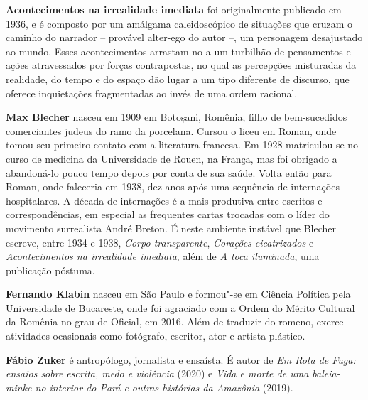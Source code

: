 \textbf{Acontecimentos na irrealidade imediata} foi originalmente publicado em 1936, e é composto por um amálgama caleidoscópico de situações que cruzam o caminho do narrador -- provável alter-ego do autor --, um personagem desajustado ao mundo. Esses acontecimentos arrastam-no a um turbilhão de pensamentos e ações atravessados por forças contrapostas, no qual as percepções misturadas da realidade, do tempo e do espaço dão lugar a um tipo diferente de discurso, que oferece inquietações fragmentadas ao invés de uma ordem racional.

\textbf{Max Blecher} nasceu em 1909 em Botoșani, Romênia, filho de bem-sucedidos comerciantes judeus do ramo da porcelana. Cursou o liceu em Roman, onde tomou seu primeiro contato com a literatura francesa. Em 1928 matriculou-se no curso de medicina da Universidade de Rouen, na França, mas foi obrigado a abandoná-lo pouco tempo depois por conta de sua saúde. Volta então para Roman, onde faleceria em 1938, dez anos após uma sequência de internações hospitalares. A década de internações é a mais produtiva entre escritos e correspondências, em especial as frequentes cartas trocadas com o líder do movimento surrealista André Breton. É neste ambiente instável que Blecher escreve, entre 1934 e 1938, \textit{Corpo transparente}, \textit{Corações cicatrizados} e \textit{Acontecimentos na irrealidade imediata}, além de \textit{A toca iluminada}, uma publicação póstuma.

\textbf{Fernando Klabin} nasceu em São Paulo e formou"-se em Ciência Política pela Universidade de Bucareste, onde foi agraciado com a Ordem do Mérito Cultural da Romênia no grau de Oficial, em 2016. Além de traduzir do romeno, exerce atividades ocasionais como fotógrafo, escritor, ator e artista plástico.

\textbf{Fábio Zuker} é antropólogo, jornalista e ensaísta. É autor de \textit{Em Rota de Fuga: ensaios sobre escrita, medo e violência} (2020) e \textit{Vida e morte de uma baleia-minke no interior do Pará e outras histórias da Amazônia} (2019).

